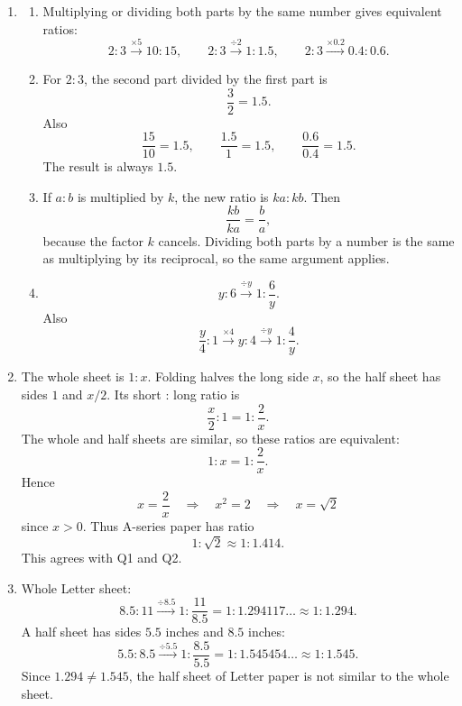 \documentclass[11pt,a4paper]{article}
\begin{document}
\begin{enumerate}[label=\textbf{Q\arabic*.}, leftmargin=*, itemsep=1.2em]
\begin{enumerate}[label=(\alph*)]
\item Let the whole sheet be \(1:n\). The half sheet has sides \(1\) and \(n/2\), so its short : long ratio is
\[
\frac n2:1=1:\frac{2}{n}.
\]
For the half sheet to have the same shape as the whole sheet, we need
\[
n=\frac{2}{n}
\quad\Longrightarrow\quad
n^2=2
\quad\Longrightarrow\quad
n=\sqrt2\approx 1.414.
\]
This lies between \(1:1.4\) and \(1:1.5\). Indeed, for \(1:1.4\) the half sheet is \(1:1.429>1.4\), while for \(1:1.5\) the half sheet is \(1:1.333<1.5\).
\end{enumerate}

\item
\begin{enumerate}[label=(\alph*)]
\item Multiplying or dividing both parts by the same number gives equivalent ratios:
\[
2:3\xrightarrow{\times 5}10:15,
\qquad
2:3\xrightarrow{\div 2}1:1.5,
\qquad
2:3\xrightarrow{\times 0.2}0.4:0.6.
\]

\item For \(2:3\), the second part divided by the first part is
\[
\frac32=1.5.
\]
Also
\[
\frac{15}{10}=1.5,
\qquad
\frac{1.5}{1}=1.5,
\qquad
\frac{0.6}{0.4}=1.5.
\]
The result is always \(1.5\).

\item If \(a:b\) is multiplied by \(k\), the new ratio is \(ka:kb\). Then
\[
\frac{kb}{ka}=\frac{b}{a},
\]
because the factor \(k\) cancels. Dividing both parts by a number is the same as multiplying by its reciprocal, so the same argument applies.

\item
\[
y:6\xrightarrow{\div y}1:\frac6y.
\]
Also
\[
\frac y4:1\xrightarrow{\times 4}y:4\xrightarrow{\div y}1:\frac4y.
\]
\end{enumerate}

\item
The whole sheet is \(1:x\). Folding halves the long side \(x\), so the half sheet has sides \(1\) and \(x/2\). Its short : long ratio is
\[
\frac x2:1=1:\frac{2}{x}.
\]
The whole and half sheets are similar, so these ratios are equivalent:
\[
1:x=1:\frac2x.
\]
Hence
\[
x=\frac2x
\quad\Longrightarrow\quad
x^2=2
\quad\Longrightarrow\quad
x=\sqrt2
\]
since \(x>0\). Thus A-series paper has ratio
\[
1:\sqrt2\approx 1:1.414.
\]
This agrees with Q1 and Q2.

\item
Whole Letter sheet:
\[
8.5:11\xrightarrow{\div 8.5}1:\frac{11}{8.5}
=1:1.294117\ldots\approx 1:1.294.
\]
A half sheet has sides \(5.5\) inches and \(8.5\) inches:
\[
5.5:8.5\xrightarrow{\div 5.5}1:\frac{8.5}{5.5}
=1:1.545454\ldots\approx 1:1.545.
\]
Since \(1.294\neq 1.545\), the half sheet of Letter paper is not similar to the whole sheet.


\end{enumerate}
\end{document}
